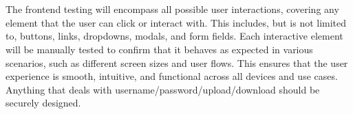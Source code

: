 \documentclass[12pt, titlepage]{article}
\begin{document}
\\\\
  The frontend testing will encompass all possible user interactions, covering any element that the user can click or interact with. This includes, but is not limited to, buttons, links, dropdowns, modals, and form fields. Each interactive element will be manually tested to confirm that it behaves as expected in various scenarios, such as different screen sizes and user flows. This ensures that the user experience is smooth, intuitive, and functional across all devices and use cases. Anything that deals with username/password/upload/download should be securely designed.
\end{document}
